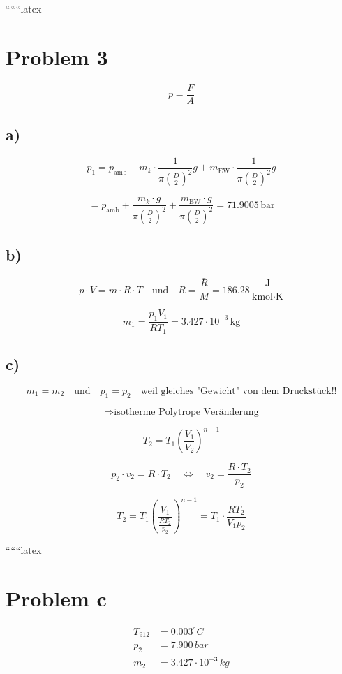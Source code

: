 
``````latex


\section*{Problem 3}

\[
p = \frac{F}{A}
\]

\subsection*{a)}
\[
p_1 = p_{\text{amb}} + m_k \cdot \frac{1}{\pi \left( \frac{D}{2} \right)^2} g + m_{\text{EW}} \cdot \frac{1}{\pi \left( \frac{D}{2} \right)^2} g
\]

\[
= p_{\text{amb}} + \frac{m_k \cdot g}{\pi \left( \frac{D}{2} \right)^2} + \frac{m_{\text{EW}} \cdot g}{\pi \left( \frac{D}{2} \right)^2} = 71.9005 \, \text{bar}
\]

\subsection*{b)}
\[
p \cdot V = m \cdot R \cdot T \quad \text{und} \quad R = \frac{\bar{R}}{M} = 186.28 \, \frac{\text{J}}{\text{kmol} \cdot \text{K}}
\]

\[
m_1 = \frac{p_1 V_1}{R T_1} = 3.427 \cdot 10^{-3} \, \text{kg}
\]

\subsection*{c)}
\[
m_1 = m_2 \quad \text{und} \quad p_1 = p_2 \quad \text{weil gleiches "Gewicht" von dem Druckstück!!}
\]

\[
\Rightarrow \text{isotherme Polytrope Veränderung}
\]

\[
T_2 = T_1 \left( \frac{V_1}{V_2} \right)^{n-1}
\]

\[
p_2 \cdot v_2 = R \cdot T_2 \quad \Leftrightarrow \quad v_2 = \frac{R \cdot T_2}{p_2}
\]

\[
T_2 = T_1 \left( \frac{V_1}{\frac{R T_2}{p_2}} \right)^{n-1} = T_1 \cdot \frac{R T_2}{V_1 p_2}
\]

``````latex


\section*{Problem c}

\begin{align*}
    T_{912} &= 0.003^\circ C \\
    p_2 &= 7.900 \, bar \\
    m_2 &= 3.427 \cdot 10^{-3} \, kg
\end{align*}

